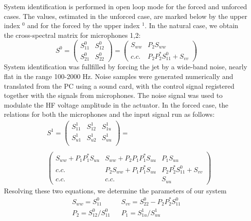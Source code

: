 \documentclass[preprint,12pt]{elsarticle}
\begin{document}
System identification is performed in open loop mode for the forced and unforced cases. The values, estimated in the unforced case, are marked below by the upper index $^0$ and for the forced by the upper index $^1$.
In the natural case, we obtain the cross-spectral matrix for microphones 1,2:
\begin{equation} \label{eq:1}
    S^0 =
    \begin{pmatrix}
        S_{11}^0 &S_{12}^0 \\
        S_{21}^0 & S_{22}^0
    \end{pmatrix}=
    \begin{pmatrix}
            S_{ww} & P_{2}S_{ww} \\ 
           c.c. & P_{2}P_{2}^*S_{11}^0+S_{vv} 
    \end{pmatrix}
\end{equation}
System identification was fullfilled by forcing the jet by a wide-band noise, nearly flat in the range 100-2000 Hz. Noise samples were generated numerically and translated from the PC using a sound card, with the control signal registered together with the signals from microphones. The noise signal was used to modulate the HF voltage amplitude in the actuator. In the forced case, the relations for both the microphones and the input signal run as follows:
\begin{eqnarray} \label{eq:2}
    &S^1 =
    \begin{pmatrix}
        S_{11}^1 &S_{12}^1 &S_{1u}^1 \\
        S_{u1}^1 &S_{u2}^1 &S_{uu}^1 \\
        \end{pmatrix}= \nonumber    \\
   \nonumber \\
    &\begin{pmatrix}
        S_{ww}+P_{1}P_{1}^*S_{uu} & S_{ww}+P_{2}P_{1}P_{1}^*S_{uu} & P_{1}S_{uu}\\
        c.c. & P_{2}S_{ww} +P_{1}P_{1}^*S_{uu} & P_{2}P_{2}^*S_{11}^0+S_{vv}  \\
        c.c. & c.c. & S_{uu}
    \end{pmatrix}
\end{eqnarray}
Resolving these two equations, we determine the parameters of our system
\begin{equation} \label{eq:3}
    \begin{matrix}
        S_{ww}=S_{11}^0      &&    S_{vv}=S_{22}^0-P_{2}P_{2}^*S_{11}^0 \\
        P_{2}=S_{12}^0/S_{11}^0  &&    P_{1}=S_{1u}^1/S_{uu}^1
    \end{matrix}
\end{equation}
\end{document}
